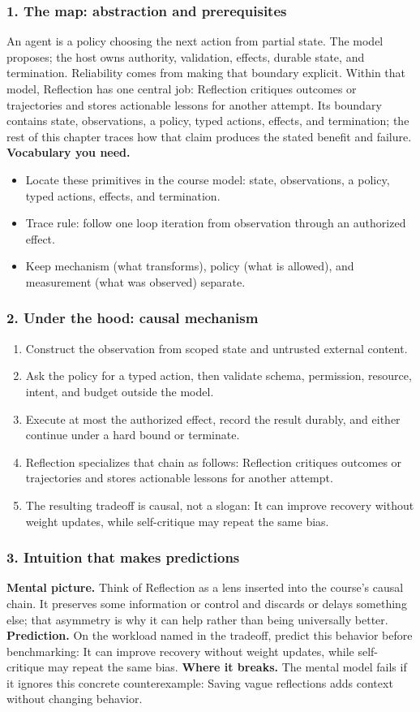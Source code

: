 \subsubsection*{1. The map: abstraction and prerequisites}
An agent is a policy choosing the next action from partial state. The model proposes; the host owns authority, validation, effects, durable state, and termination. Reliability comes from making that boundary explicit.
Within that model, Reflection has one central job: Reflection critiques outcomes or trajectories and stores actionable lessons for another attempt. Its boundary contains state, observations, a policy, typed actions, effects, and termination; the rest of this chapter traces how that claim produces the stated benefit and failure.
\textbf{Vocabulary you need.}\begin{itemize}
\item Locate these primitives in the course model: state, observations, a policy, typed actions, effects, and termination.
\item Trace rule: follow one loop iteration from observation through an authorized effect.
\item Keep mechanism (what transforms), policy (what is allowed), and measurement (what was observed) separate.
\end{itemize}
\subsubsection*{2. Under the hood: causal mechanism}\begin{enumerate}
\item Construct the observation from scoped state and untrusted external content.
\item Ask the policy for a typed action, then validate schema, permission, resource, intent, and budget outside the model.
\item Execute at most the authorized effect, record the result durably, and either continue under a hard bound or terminate.
\item Reflection specializes that chain as follows: Reflection critiques outcomes or trajectories and stores actionable lessons for another attempt.
\item The resulting tradeoff is causal, not a slogan: It can improve recovery without weight updates, while self-critique may repeat the same bias.
\end{enumerate}
\subsubsection*{3. Intuition that makes predictions}
\textbf{Mental picture.} Think of Reflection as a lens inserted into the course's causal chain. It preserves some information or control and discards or delays something else; that asymmetry is why it can help rather than being universally better.
\textbf{Prediction.} On the workload named in the tradeoff, predict this behavior before benchmarking: It can improve recovery without weight updates, while self-critique may repeat the same bias.
\textbf{Where it breaks.} The mental model fails if it ignores this concrete counterexample: Saving vague reflections adds context without changing behavior.
